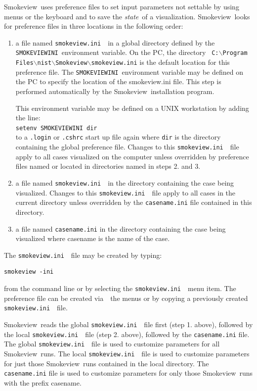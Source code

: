 \documentclass[11pt,twoside]{book}
\newcommand{\svini}{{\tt smokeview.ini}\ }
\newcommand{\Smokeview}{{Smokeview}}
\newcommand{\smokeview}{{Smokeview}}
\newcommand{\via}{{via\ }}
\begin{document}
\Smokeview\ uses preference files to set input parameters not
settable by using menus or the keyboard and to save the {\em state}\
of a visualization. \Smokeview\ looks for preference files in
three locations in the following order:
\begin{enumerate}

\item a file named \svini\ in a global directory
defined by the {\tt SMOKEVIEWINI}\ environment variable. On the PC,
the directory
{\tt
C:$\backslash$Program Files$\backslash$nist$\backslash$Smokeview$\backslash$smokeview.ini} is the
default location for this preference file. The {\tt SMOKEVIEWINI}\
environment variable may be defined on the
PC to specify the location of the smokeview.ini file. This
step is performed automatically by the \smokeview\ installation
program.

This environment variable may be
defined on a UNIX workstation by adding the line:\\

{\tt setenv SMOKEVIEWINI dir} \\

to a {\tt .login}  or {\tt .cshrc} start up file
again where {\tt dir} is the directory containing the
global preference file. Changes to this \svini\
file apply to all cases visualized on the computer unless
overridden by preference files named or located in
directories named in steps 2. and  3.

\item a file named \svini\ in the directory
containing the case being visualized.  Changes to this \svini\ file apply to all cases in the current
directory unless overridden by the {\tt casename.ini} file
contained in this directory.

\item a file named {\tt casename.ini} in the directory containing the case being
visualized where casename is the name of the case.
\end{enumerate}

The \svini\ file may be created by typing:
\begin{verbatim}
smokeview -ini
\end{verbatim}
\noindent from the command line or by selecting the \svini\ menu item. The 
preference file can be created \via\ the menus or by copying a
previously created \svini\ file.

\Smokeview\ reads the global \svini\ file first (step 1. above),
followed by the local \svini\ file (step 2. above),
followed by the {\tt casename.ini} file.
The global \svini\ file is used to customize parameters for all \smokeview\ runs.
The local \svini\  file is used to customize parameters for just those \smokeview\ runs
contained in the local directory.
The {\tt casename.ini} file is used to customize parameters for only
those \smokeview\ runs with the prefix casename.
\end{document}
